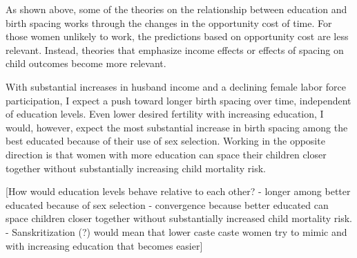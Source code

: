 As shown above, some of the theories on the relationship between education and birth 
spacing works through the changes in the opportunity cost of time. 
For those women unlikely to work, the predictions based on opportunity cost are 
less relevant. 
Instead, theories that emphasize income effects or effects of spacing on child
outcomes become more relevant. 

With substantial increases in husband income and a declining female labor force 
participation, I expect a push toward longer birth spacing over time, independent
of education levels.
Even lower desired fertility with increasing education, I would, however, expect
the most substantial increase in birth spacing among the best educated because
of their use of sex selection.
Working in the opposite direction is that women with more education can space
their children closer together without substantially increasing child mortality risk.


[How would education levels behave relative to each other?
- longer among better educated because of sex selection
- convergence because better educated can space children closer together without 
  substantially increased child mortality risk.
- Sanskritization (?) would mean that lower caste caste women try to mimic 
  and with increasing education that becomes easier]
